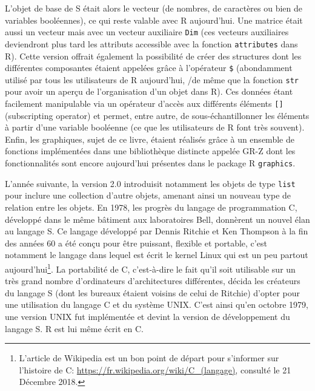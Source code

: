 \documentclass[]{article}
\begin{document}
L'objet de base de S était alors le vecteur (de nombres, de caractères ou bien de variables booléennes), ce qui reste valable avec R aujourd'hui. Une matrice
était aussi un vecteur mais avec un vecteur auxiliaire \texttt{Dim} (ces vecteurs
auxiliaires deviendront plus tard les attributs accessible avec la fonction
\texttt{attributes} dans R). Cette version offrait également la possibilité de créer
des structures dont les différentes composantes étaient appelées grâce à
l'opérateur \texttt{\$} (abondamment utilisé par tous les utilisateurs de R
aujourd'hui, /de même que la fonction \texttt{str} pour avoir un aperçu de l'organisation d'un objet dans R). Ces données étant facilement manipulable via un opérateur d'accès aux différents éléments \texttt{{[}{]}} (subscripting operator) et permet, entre autre, de sous-échantillonner les éléments à partir d'une variable booléenne (ce que les utilisateurs de R font très souvent). Enfin, les graphiques, sujet de ce livre, étaient réalisés grâce à un ensemble de fonctions implémentées dans une bibliothèque distincte appelée GR-Z dont les fonctionnalités sont encore aujourd'hui présentes dans le package R \texttt{graphics}.

L'année suivante, la version 2.0 introduisit notamment les objets de type \texttt{list} pour inclure une collection d'autre objets, amenant ainsi un nouveau type de relation entre les objets. En 1978, les progrès du langage de programmation C, développé dans le même bâtiment aux laboratoires Bell, donnèrent un nouvel élan au langage S. Ce langage développé par Dennis Ritchie et Ken Thompson à la fin des années 60 a été conçu pour être puissant, flexible et
portable, c'est notamment le langage dans lequel est écrit le kernel Linux qui
est un peu partout aujourd'hui\footnote{L'article de Wikipedia est un bon point de départ pour s'informer sur l'histoire de C: \url{https://fr.wikipedia.org/wiki/C_(langage)}, consulté le 21 Décembre 2018.}. La portabilité de C, c'est-à-dire le fait qu'il soit utilisable sur un très grand nombre d'ordinateurs d'architectures différentes, décida les créateurs du langage S (dont les bureaux étaient voisins de celui de Ritchie) d'opter pour une utilisation du langage C et du système UNIX. C'est ainsi qu'en octobre 1979, une version UNIX fut implémentée et devint la version de développement du langage S. R est lui
même écrit en C.
\end{document}
